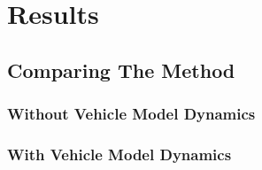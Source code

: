 \chapter{Results}

\section{Comparing The Method}
\subsection{Without Vehicle Model Dynamics}
\subsection{With Vehicle Model Dynamics}
